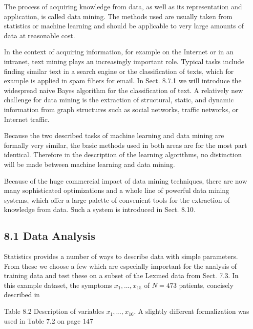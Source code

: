 \documentclass[10pt]{article}
\begin{document}
The process of acquiring knowledge from data, as well as its representation and application, is called data mining. The methods used are usually taken from statistics or machine learning and should be applicable to very large amounts of data at reasonable cost.

In the context of acquiring information, for example on the Internet or in an intranet, text mining plays an increasingly important role. Typical tasks include finding similar text in a search engine or the classification of texts, which for example is applied in spam filters for email. In Sect. 8.7.1 we will introduce the widespread naive Bayes algorithm for the classification of text. A relatively new challenge for data mining is the extraction of structural, static, and dynamic information from graph structures such as social networks, traffic networks, or Internet traffic.

Because the two described tasks of machine learning and data mining are formally very similar, the basic methods used in both areas are for the most part identical. Therefore in the description of the learning algorithms, no distinction will be made between machine learning and data mining.

Because of the huge commercial impact of data mining techniques, there are now many sophisticated optimizations and a whole line of powerful data mining systems, which offer a large palette of convenient tools for the extraction of knowledge from data. Such a system is introduced in Sect. 8.10.

\subsection*{8.1 Data Analysis}
Statistics provides a number of ways to describe data with simple parameters. From these we choose a few which are especially important for the analysis of training data and test these on a subset of the Lexmed data from Sect. 7.3. In this example dataset, the symptoms $x_{1}, \ldots, x_{15}$ of $N=473$ patients, concisely described in

Table 8.2 Description of variables $x_{1}, \ldots, x_{16}$. A slightly different formalization was used in Table 7.2 on page 147
\end{document}
